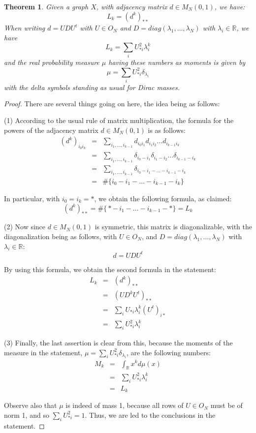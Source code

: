 \documentclass[12pt]{amsbook}
\newtheorem{theorem}{Theorem}[chapter]
\begin{document}

\begin{theorem}
Given a graph $X$, with adjacency matrix $d\in M_N(0,1)$, we have:
$$L_k=(d^k)_{**}$$
When writing $d=UDU^t$ with $U\in O_N$ and $D=diag(\lambda_1,\ldots,\lambda_N)$ with $\lambda_i\in\mathbb R$, we have
$$L_k=\sum_iU_{*i}^2\lambda_i^k$$
and the real probability measure $\mu$ having these numbers as moments is given by
$$\mu=\sum_iU_{*i}^2\delta_{\lambda_i}$$
with the delta symbols standing as usual for Dirac masses.
\end{theorem}

\begin{proof}
There are several things going on here, the idea being as follows:

\medskip

(1) According to the usual rule of matrix multiplication, the formula for the powers of the adjacency matrix $d\in M_N(0,1)$ is as follows:
\begin{eqnarray*}
(d^k)_{i_0i_k}
&=&\sum_{i_1,\ldots,i_{k-1}}d_{i_0i_1}d_{i_1i_2}\ldots d_{i_{k-1}i_k}\\
&=&\sum_{i_1,\ldots,i_{k-1}}\delta_{i_0-i_1}\delta_{i_1-i_2}\ldots\delta_{i_{k-1}-i_k}\\
&=&\sum_{i_1,\ldots,i_{k-1}}\delta_{i_0-i_1-\ldots-i_{k-1}-i_k}\\
&=&\#\Big\{i_0-i_1-\ldots-i_{k-1}-i_k\Big\}
\end{eqnarray*}

In particular, with $i_0=i_k=*$, we obtain the following formula, as claimed:
$$(d^k)_{**}=\#\Big\{\!*-\,i_1-\ldots-i_{k-1}-*\Big\}=L_k$$

(2) Now since $d\in M_N(0,1)$ is symmetric, this matrix is diagonalizable, with the diagonalization being as follows, with $U\in O_N$, and $D=diag(\lambda_1,\ldots,\lambda_N)$ with $\lambda_i\in\mathbb R$:
$$d=UDU^t$$

By using this formula, we obtain the second formula in the statement:
\begin{eqnarray*}
L_k
&=&(d^k)_{**}\\
&=&(UD^kU^t)_{**}\\
&=&\sum_iU_{*i}\lambda_i^k(U^t)_{i*}\\
&=&\sum_iU_{*i}^2\lambda_i^k
\end{eqnarray*}

(3) Finally, the last assertion is clear from this, because the moments of the measure in the statement, $\mu=\sum_iU_{*i}^2\delta_{\lambda_i}$, are the following numbers:
\begin{eqnarray*}
M_k
&=&\int_\mathbb Rx^kd\mu(x)\\
&=&\sum_iU_{*i}^2\lambda_i^k\\
&=&L_k
\end{eqnarray*}

Observe also that $\mu$ is indeed of mass 1, because all rows of $U\in O_N$ must be of norm 1, and so $\sum_iU_{*i}^2=1$. Thus, we are led to the conclusions in the statement.
\end{proof}
\end{document}

